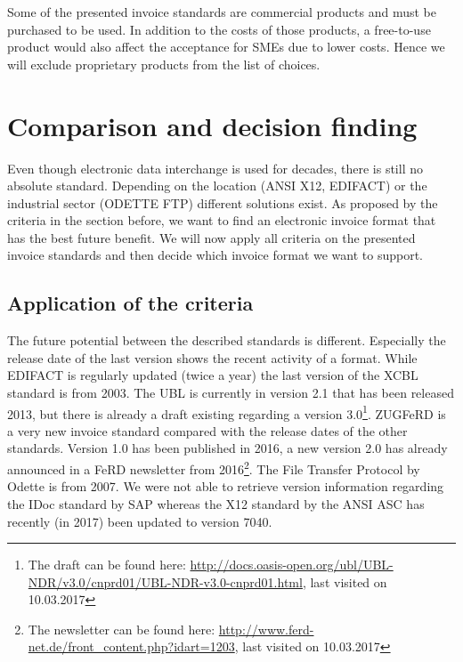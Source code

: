 Some of the presented invoice standards are commercial products and must be purchased to be used. In addition to the costs of those products, a free-to-use product would also affect the acceptance for SMEs due to lower costs. Hence we will exclude proprietary products from the list of choices. 

\section{Comparison and decision finding}
\label{sec2.3}

Even though electronic data interchange is used for decades, there is still no absolute standard. Depending on the location (ANSI X12, EDIFACT) or the industrial sector (ODETTE FTP) different solutions exist. As proposed by the criteria in the section before, we want to find an electronic invoice format that has the best future benefit. We will now apply all criteria on the presented invoice standards and then decide which invoice format we want to support.

\subsection{Application of the criteria}
\label{sec2.3.1}

The future potential between the described standards is different. Especially the release date of the last version shows the recent activity of a format. While EDIFACT is regularly updated (twice a year) the last version of the XCBL standard is from 2003. The UBL is currently in version 2.1 that has been released 2013, but there is already a draft existing regarding a version 3.0\footnote{The draft can be found here: \url{http://docs.oasis-open.org/ubl/UBL-NDR/v3.0/cnprd01/UBL-NDR-v3.0-cnprd01.html}, last visited on 10.03.2017}. ZUGFeRD is a very new invoice standard compared with the release dates of the other standards. Version 1.0 has been published in 2016, a new version 2.0 has already announced in a FeRD newsletter from 2016\footnote{The newsletter can be found here: \url{http://www.ferd-net.de/front_content.php?idart=1203}, last visited on 10.03.2017}. The File Transfer Protocol by Odette is from 2007. We were not able to retrieve version information regarding the IDoc standard by SAP whereas the X12 standard by the ANSI ASC has recently (in 2017) been updated to version 7040.

